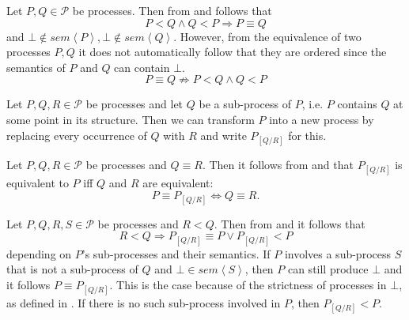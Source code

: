 \begin{corollary}
\label{crl:equivalence_ordered_processes}
Let $P, Q \in \mathcal{P}$ be processes. Then from  and  follows that
  \begin{equation}
    P < Q \wedge Q < P \Rightarrow P \equiv Q
  \end{equation}
  and $\bot \notin sem \left\langle P \right\rangle, \bot \notin sem \left\langle Q \right\rangle$. However, from the equivalence of two processes $P, Q$ it does not automatically follow that they are ordered since the semantics of $P$ and $Q$ can contain $\bot$.
  \begin{equation}
    P \equiv Q \not\Rightarrow P < Q \wedge Q < P
\end{equation}    
  \hfill\qedsymbol
\end{corollary}

\begin{definition}
\label{def:process_substitution}
Let $P, Q, R \in \mathcal{P}$ be processes and let $Q$ be a sub-process of $P$, i.e. $P$ contains $Q$ at some point in its structure. Then we can transform $P$ into a new process by replacing every occurrence of $Q$ with $R$ and write $P_{\left[ Q / R \right]}$ for this.

\hfill\qedsymbol
\end{definition}

\begin{corollary}
\label{crl:process_substitution}
Let $P, Q, R \in \mathcal{P}$ be processes and $Q \equiv R$. Then it follows from  and  that $P_{\left[ Q / R \right]}$ is equivalent to $P$ iff $Q$ and $R$ are equivalent:
  \begin{equation}
    P \equiv P_{\left[ Q / R \right]} \Leftrightarrow Q \equiv R.
  \end{equation}
  \hfill\qedsymbol
\end{corollary}

\begin{corollary}
Let $P, Q, R, S \in \mathcal{P}$ be processes and $R < Q$. Then from  and  it follows that
  \begin{equation}
    R < Q \Rightarrow P_{\left[ Q / R \right]} \equiv P \lor P_{\left[ Q / R \right]} < P
  \end{equation}
  depending on $P$'s sub-processes and their semantics. If $P$ involves a sub-process $S$ that is not a sub-process of $Q$ and $\bot \in sem \left\langle S \right\rangle$, then $P$ can still produce $\bot$ and it follows $P \equiv P_{\left[Q / R \right]}$. This is the case because of the strictness of processes in $\bot$, as defined in . If there is no such sub-process involved in $P$, then $P_{\left[Q / R \right]} < P$.
    
  \hfill\qedsymbol
\end{corollary}

